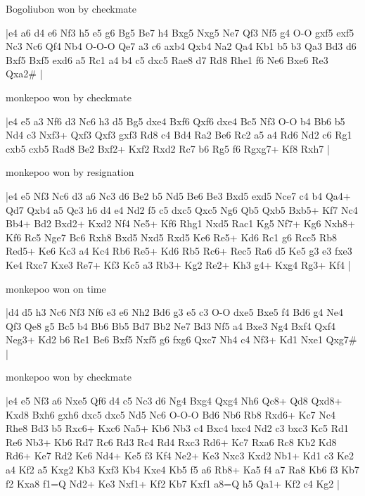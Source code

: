 \showboard

Bogoliubon won by checkmate

\makegametitle
|e4 a6 d4 e6 Nf3 h5 e5 g6 Bg5 Be7 h4 Bxg5 Nxg5 Ne7 Qf3 Nf5 g4 O-O gxf5 exf5 Nc3 Nc6 Qf4 Nb4 O-O-O Qe7 a3 c6 axb4 Qxb4 Na2 Qa4 Kb1 b5 b3 Qa3 Bd3 d6 Bxf5 Bxf5 exd6 a5 Rc1 a4 b4 c5 dxc5 Rae8 d7 Rd8 Rhe1 f6 Ne6 Bxe6 Re3 Qxa2\#  |

\showboard

monkepoo won by checkmate

\makegametitle
|e4 e5 a3 Nf6 d3 Nc6 h3 d5 Bg5 dxe4 Bxf6 Qxf6 dxe4 Bc5 Nf3 O-O b4 Bb6 b5 Nd4 c3 Nxf3+ Qxf3 Qxf3 gxf3 Rd8 c4 Bd4 Ra2 Be6 Rc2 a5 a4 Rd6 Nd2 c6 Rg1 cxb5 cxb5 Rad8 Be2 Bxf2+ Kxf2 Rxd2 Rc7 b6 Rg5 f6 Rgxg7+ Kf8 Rxh7  |

\showboard

monkepoo won by resignation

\makegametitle
|e4 e5 Nf3 Nc6 d3 a6 Nc3 d6 Be2 b5 Nd5 Be6 Be3 Bxd5 exd5 Nce7 c4 b4 Qa4+ Qd7 Qxb4 a5 Qc3 h6 d4 e4 Nd2 f5 c5 dxc5 Qxc5 Ng6 Qb5 Qxb5 Bxb5+ Kf7 Nc4 Bb4+ Bd2 Bxd2+ Kxd2 Nf4 Ne5+ Kf6 Rhg1 Nxd5 Rac1 Kg5 Nf7+ Kg6 Nxh8+ Kf6 Rc5 Nge7 Bc6 Rxh8 Bxd5 Nxd5 Rxd5 Ke6 Re5+ Kd6 Rc1 g6 Rcc5 Rb8 Red5+ Ke6 Kc3 a4 Kc4 Rb6 Re5+ Kd6 Rb5 Rc6+ Rec5 Ra6 d5 Ke5 g3 e3 fxe3 Ke4 Rxc7 Kxe3 Re7+ Kf3 Kc5 a3 Rb3+ Kg2 Re2+ Kh3 g4+ Kxg4 Rg3+ Kf4  |

\showboard

monkepoo won on time

\makegametitle
|d4 d5 h3 Nc6 Nf3 Nf6 e3 e6 Nh2 Bd6 g3 e5 c3 O-O dxe5 Bxe5 f4 Bd6 g4 Ne4 Qf3 Qe8 g5 Bc5 b4 Bb6 Bb5 Bd7 Bb2 Ne7 Bd3 Nf5 a4 Bxe3 Ng4 Bxf4 Qxf4 Neg3+ Kd2 b6 Re1 Be6 Bxf5 Nxf5 g6 fxg6 Qxc7 Nh4 c4 Nf3+ Kd1 Nxe1 Qxg7\#  |

\showboard

monkepoo won by checkmate

\makegametitle
|e4 e5 Nf3 a6 Nxe5 Qf6 d4 c5 Nc3 d6 Ng4 Bxg4 Qxg4 Nh6 Qc8+ Qd8 Qxd8+ Kxd8 Bxh6 gxh6 dxc5 dxc5 Nd5 Nc6 O-O-O Bd6 Nb6 Rb8 Rxd6+ Kc7 Nc4 Rhe8 Bd3 b5 Rxc6+ Kxc6 Na5+ Kb6 Nb3 c4 Bxc4 bxc4 Nd2 c3 bxc3 Kc5 Rd1 Re6 Nb3+ Kb6 Rd7 Rc6 Rd3 Rc4 Rd4 Rxc3 Rd6+ Kc7 Rxa6 Rc8 Kb2 Kd8 Rd6+ Ke7 Rd2 Ke6 Nd4+ Ke5 f3 Kf4 Ne2+ Ke3 Nxc3 Kxd2 Nb1+ Kd1 c3 Ke2 a4 Kf2 a5 Kxg2 Kb3 Kxf3 Kb4 Kxe4 Kb5 f5 a6 Rb8+ Ka5 f4 a7 Ra8 Kb6 f3 Kb7 f2 Kxa8 f1=Q Nd2+ Ke3 Nxf1+ Kf2 Kb7 Kxf1 a8=Q h5 Qa1+ Kf2 c4 Kg2  |

